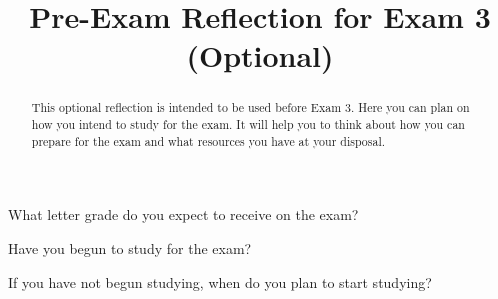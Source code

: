 \documentclass{ximera}
\title{Pre-Exam Reflection for Exam 3 (Optional)}
\begin{document}
\begin{abstract}
This optional reflection is intended to be used before Exam 3. Here you can plan on how you intend to study for the exam. It will help you to think about how you can prepare for the exam and what resources you have at your disposal.
\end{abstract}
\maketitle


\begin{question}
    What letter grade do you expect to receive on the exam?

  \begin{multipleChoice}
  \end{multipleChoice}
\end{question}

\begin{question}
    Have you begun to study for the exam?

  \begin{multipleChoice}
  \end{multipleChoice}
\end{question}

\begin{question}
    If you have not begun studying, when do you plan to start studying?

  \begin{multipleChoice}
  \end{multipleChoice}
\end{question}
\end{document}
